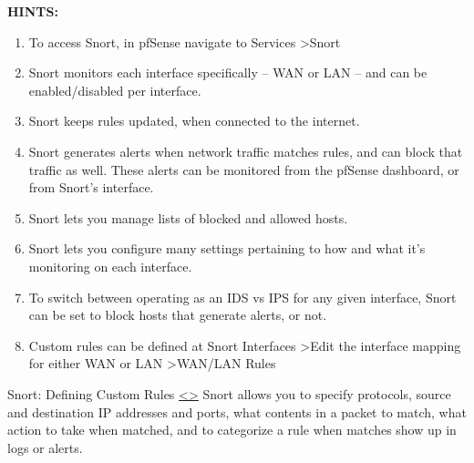 \documentclass[12pt]{extarticle}
\newenvironment{instructionblock}{\Large\bgroup}{\egroup}
\begin{document}
\vspace{8mm}
\noindent
\textbf{HINTS:}
\begin{enumerate}
    \item To access Snort, in pfSense navigate to Services \textgreater Snort
    \item Snort monitors each interface specifically -- WAN or LAN -- and can be enabled/disabled per interface.
    \item Snort keeps rules updated, when connected to the internet.
    \item Snort generates alerts when network traffic matches rules, and can block that traffic as well. These alerts can be monitored from the pfSense dashboard, or from Snort's interface.
    \item Snort lets you manage lists of blocked and allowed hosts.
    \item Snort lets you configure many settings pertaining to how and what it's monitoring on each interface.
    \item To switch between operating as an IDS vs IPS for any given interface, Snort can be set to block hosts that generate alerts, or not. 
    \item Custom rules can be defined at Snort Interfaces \textgreater Edit the interface mapping for either WAN or LAN \textgreater WAN/LAN Rules
\end{enumerate}








\pagebreak
\begin{slide}{ Snort: Defining Custom Rules }{ \hyperref[slide 16]{\textless}\hyperref[slide 18]{\textgreater} }
	\vskip 5pt
\begin{instructionblock}
    Snort allows you to specify protocols, source and destination IP addresses and ports, what contents in a packet to match, what action to take when matched, and to categorize a rule when matches show up in logs or alerts.

\end{instructionblock}
\end{slide}
\end{document}
